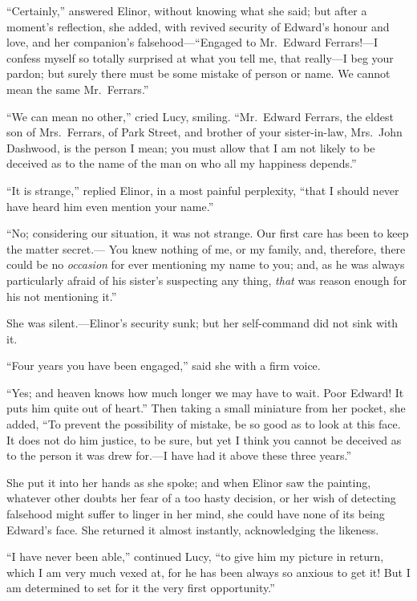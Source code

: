 \documentclass{article}
\begin{document}
``Certainly,'' answered Elinor, without knowing what
she said; but after a moment's reflection, she added,
with revived security of Edward's honour and love,
and her companion's falsehood---``Engaged to Mr.\ Edward
Ferrars!---I confess myself so totally surprised at
what you tell me, that really---I beg your pardon;
but surely there must be some mistake of person or name.
We cannot mean the same Mr.\ Ferrars.''

``We can mean no other,'' cried Lucy, smiling.  ``Mr.\ Edward
Ferrars, the eldest son of Mrs.\ Ferrars, of Park Street,
and brother of your sister-in-law, Mrs.\ John Dashwood,
is the person I mean; you must allow that I am not likely
to be deceived as to the name of the man on who all my happiness
depends.''

``It is strange,'' replied Elinor, in a most painful perplexity,
``that I should never have heard him even mention your name.''

``No; considering our situation, it was not strange.
Our first care has been to keep the matter secret.---%
You knew nothing of me, or my family, and, therefore,
there could be no \emph{occasion} for ever mentioning my name
to you; and, as he was always particularly afraid of his
sister's suspecting any thing, \emph{that} was reason enough
for his not mentioning it.''

She was silent.---Elinor's security sunk; but her
self-command did not sink with it.

``Four years you have been engaged,'' said she
with a firm voice.

``Yes; and heaven knows how much longer we may have
to wait.  Poor Edward!  It puts him quite out of heart.''
Then taking a small miniature from her pocket, she added,
``To prevent the possibility of mistake, be so good as to look
at this face.  It does not do him justice, to be sure,
but yet I think you cannot be deceived as to the person
it was drew for.---I have had it above these three years.''

She put it into her hands as she spoke; and when Elinor
saw the painting, whatever other doubts her fear of a
too hasty decision, or her wish of detecting falsehood
might suffer to linger in her mind, she could have none of
its being Edward's face.  She returned it almost instantly,
acknowledging the likeness.

``I have never been able,'' continued Lucy, ``to give
him my picture in return, which I am very much vexed at,
for he has been always so anxious to get it!  But I am
determined to set for it the very first opportunity.''
\end{document}
